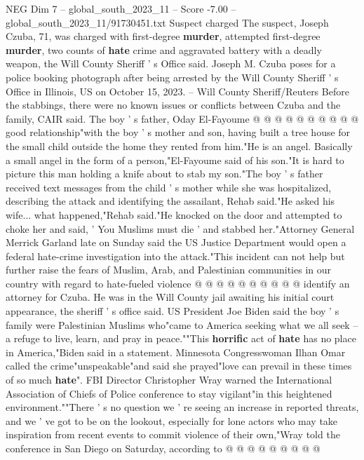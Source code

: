 \begin{textsample}{NEG Dim 7 – global\_south\_2023\_11 – Score -7.00 – global\_south\_2023\_11/91730451.txt}
Suspect charged The suspect, Joseph Czuba, 71, was charged with first-degree \textbf{murder}, attempted first-degree \textbf{murder}, two counts of \textbf{hate} crime and aggravated battery with a deadly weapon, the Will County Sheriff ' s Office said.
Joseph M.
Czuba poses for a police booking photograph after being arrested by the Will County Sheriff ' s Office in Illinois, US on October 15, 2023. -- Will County Sheriff/Reuters Before the stabbings, there were no known issues or conflicts between Czuba and the family, CAIR said.
The boy ' s father, Oday El-Fayoume @ @ @ @ @ @ @ @ @ @ good relationship"with the boy ' s mother and son, having built a tree house for the small child outside the home they rented from him."He is an angel.
Basically a small angel in the form of a person,"El-Fayoume said of his son."It is hard to picture this man holding a knife about to stab my son."The boy ' s father received text messages from the child ' s mother while she was hospitalized, describing the attack and identifying the assailant, Rehab said."He asked his wife... what happened,"Rehab said."He knocked on the door and attempted to choke her and said, ' You Muslims must die ' and stabbed her."Attorney General Merrick Garland late on Sunday said the US Justice Department would open a federal hate-crime investigation into the attack."This incident can not help but further raise the fears of Muslim, Arab, and Palestinian communities in our country with regard to hate-fueled violence @ @ @ @ @ @ @ @ @ @ identify an attorney for Czuba.
He was in the Will County jail awaiting his initial court appearance, the sheriff ' s office said.
US President Joe Biden said the boy ' s family were Palestinian Muslims who"came to America seeking what we all seek -- a refuge to live, learn, and pray in peace.""This \textbf{horrific} act of \textbf{hate} has no place in America,"Biden said in a statement.
Minnesota Congresswoman Ilhan Omar called the crime"unspeakable"and said she prayed"love can prevail in these times of so much \textbf{hate}".
FBI Director Christopher Wray warned the International Association of Chiefs of Police conference to stay vigilant"in this heightened environment.""There ' s no question we ' re seeing an increase in reported threats, and we ' ve got to be on the lookout, especially for lone actors who may take inspiration from recent events to commit violence of their own,"Wray told the conference in San Diego on Saturday, according to @ @ @ @ @ @ @ @ @

\end{textsample}
